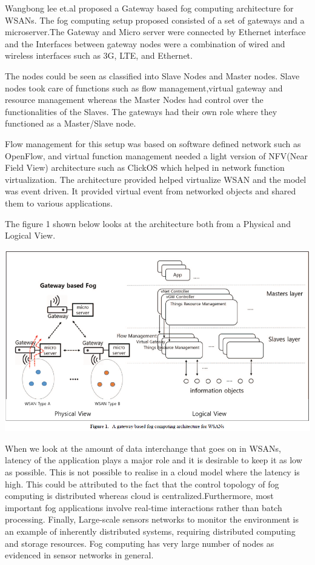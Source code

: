\documentclass{article}
\begin{document}
Wangbong lee et.al\cite{lee2016gateway} proposed a Gateway based fog computing architecture for WSANs. The fog computing setup proposed consisted of a set of gateways and a microserver\cite{lee2016gateway}.The Gateway and Micro server were connected by Ethernet interface and the Interfaces between gateway nodes were a combination of wired and wireless interfaces such as 3G, LTE, and Ethernet\cite{lee2016gateway}.

The nodes could be seen as classified into Slave Nodes and Master nodes. Slave nodes took care of functions such as flow management,virtual gateway and resource management whereas the Master Nodes had control over the functionalities of the Slaves\cite{lee2016gateway}. The gateways had their own role where they functioned as a Master/Slave node. 

Flow management for this setup was based on software defined network such as OpenFlow, and virtual function management needed a light version of NFV(Near Field View) architecture such as ClickOS\cite{martins2014clickos} which helped in network function virtualization.
The architecture provided helped virtualize WSAN and the model was event driven. It provided virtual event from networked objects and shared them to various applications.

The figure 1 shown below\cite{lee2016gateway} looks at the architecture both from a Physical and Logical View.

\includegraphics[scale=0.6]{gateway.png}

When we look at the amount of data interchange that goes on in WSANs, latency of the application plays a major role and it is desirable to keep it as low as possible. This is not possible to realise in a cloud model where the latency is high. This could be attributed to the fact that the control topology of fog computing is distributed whereas cloud is centralized\cite{lee2016gateway}.Furthermore, most important fog applications involve real-time interactions rather than batch processing\cite{lee2016gateway}. 
Finally, Large-scale sensors networks to monitor the environment is an example of inherently distributed systems, requiring distributed computing and storage resources. Fog computing has very large number of nodes as evidenced in sensor networks in general\cite{lee2016gateway}. 
\end{document}
